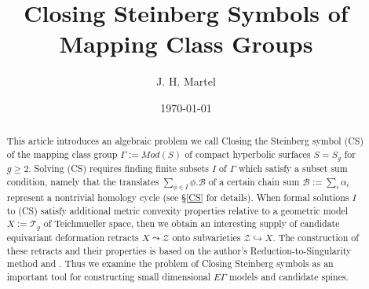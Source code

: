 \documentclass[12pt]{amsart}
\theoremstyle{definition}
\theoremstyle{remark}
\newcommand{\sB}{\mathscr{B}}
\newcommand{\sT}{\mathscr{T}}
\newcommand{\sZ}{\mathscr{Z}}
\begin{document}
\title[Closing Steinberg Symbols of Mapping Class Groups]{Closing Steinberg Symbols of Mapping Class Groups}
\author{J. H. Martel}
\date{\today}
\maketitle

\begin{abstract}
This article introduces an algebraic problem we call Closing the Steinberg symbol (CS) of the mapping class group $\Gamma:=Mod(S)$ of compact hyperbolic surfaces $S=S_g$ for $g\geq 2$. Solving (CS) requires finding finite subsets $I$ of $\Gamma$ which satisfy a subset sum condition, namely that the translates $\sum_{\phi \in I}\phi.\sB$ of a certain chain sum $\sB:=\sum_i \alpha_i$ represent a nontrivial homology cycle (see \S\ref{CS} for details). When formal solutions $I$ to (CS) satisfy additional metric convexity properties relative to a geometric model $X:=\sT_g$ of Teichmueller space, then we obtain an interesting supply of candidate equivariant deformation retracts $X \leadsto \sZ$ onto subvarieties $\sZ \hookrightarrow X$. The construction of these retracts and their properties is based on the author's Reduction-to-Singularity method \cite{martel} and \cite{martel2022}. Thus we examine the problem of Closing Steinberg symbols as an important tool for constructing small dimensional $E\Gamma$ models and candidate spines. 
\end{abstract}


\tableofcontents





\end{document}
